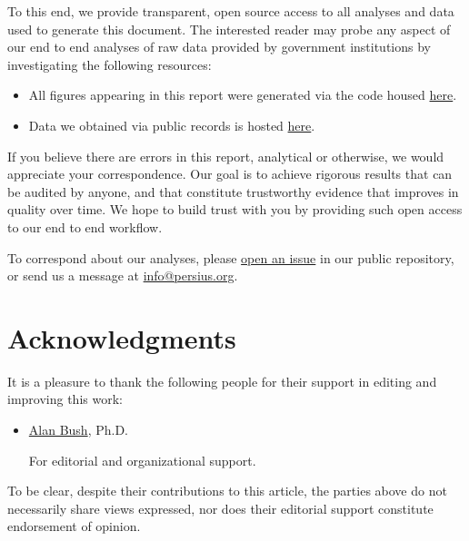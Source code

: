 \documentclass[12pt, a4paper,twoside,parskip=full]{report}
\theoremstyle{plain} %
\theoremstyle{definition} %
\theoremstyle{remark} %
\numberwithin{equation}{chapter}
\begin{document}
		
		To this end, we provide transparent, open source access to all analyses and data used to generate this document. The interested reader may probe any aspect of our end to end analyses of raw data provided by government institutions by investigating the following resources:
		
		\begin{itemize}
			\item All figures appearing in this report were
			generated via the code housed
			\href{https://github.com/TPAFS/investigations/tree/initial_denial_investigation/investigations/claims_denials}{here}.
			
			\item Data we obtained via public records is hosted \href{https://github.com/TPAFS/public-records}{here}.
			
		\end{itemize}
		
		
		If you believe there are errors in this report, analytical or otherwise, we would appreciate your correspondence. Our goal is to achieve rigorous 
		results that can be audited by anyone, and that constitute trustworthy evidence that improves in quality over
		time. We hope to build trust with you by providing such open access to our end to end workflow.
		
		To correspond about our analyses, please \href{https://github.com/TPAFS/investigations/issues}{open an issue}
		in our public repository, or send us a message at \href{info@persius.org}{info@persius.org}.

		
		\chapter{Acknowledgments}
		
		It is a pleasure to thank the following people for their support in editing
		and improving this work:
		
		\begin{itemize}
			\item \href{https://www.freerangeprofessor.com/}{Alan Bush}, Ph.D.
			
			For editorial and organizational support.
		\end{itemize}
		
		\noindent To be clear, despite their contributions to this article, the parties above do not necessarily share
		views expressed, nor does their editorial support constitute endorsement of opinion.
		
	
		
\end{document}
